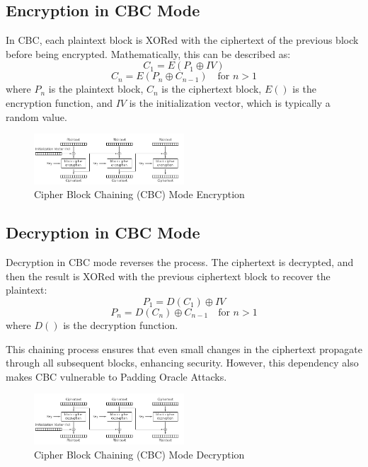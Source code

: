 \documentclass[conference]{IEEEtran}
\begin{document}
\subsection{Encryption in CBC Mode}
In CBC, each plaintext block is XORed with the ciphertext of the previous block before being encrypted. Mathematically, this can be described as:
\[
C_1 = E(P_1 \oplus IV)
\]
\[
C_n = E(P_n \oplus C_{n-1}) \quad \text{for } n > 1
\]
where \(P_n\) is the plaintext block, \(C_n\) is the ciphertext block, \(E()\) is the encryption function, and \(IV\) is the initialization vector, which is typically a random value.

\begin{figure}[!htb]
    \centering
    \includegraphics[width=0.5\textwidth]{./../CBC_encryption.png}
    \caption{Cipher Block Chaining (CBC) Mode Encryption}
    \label{fig:enter-label}
\end{figure}

\subsection{Decryption in CBC Mode}
Decryption in CBC mode reverses the process. The ciphertext is decrypted, and then the result is XORed with the previous ciphertext block to recover the plaintext:
\[
P_1 = D(C_1) \oplus IV
\]
\[
P_n = D(C_n) \oplus C_{n-1} \quad \text{for } n > 1
\]
where \(D()\) is the decryption function. 

This chaining process ensures that even small changes in the ciphertext propagate through all subsequent blocks, enhancing security. However, this dependency also makes CBC vulnerable to Padding Oracle Attacks.

\begin{figure}[!htb]
    \centering
    \includegraphics[width=0.5\textwidth]{./../CBC_decryption.png}
    \caption{Cipher Block Chaining (CBC) Mode Decryption}
    \label{fig:enter-label}
\end{figure}
\end{document}
